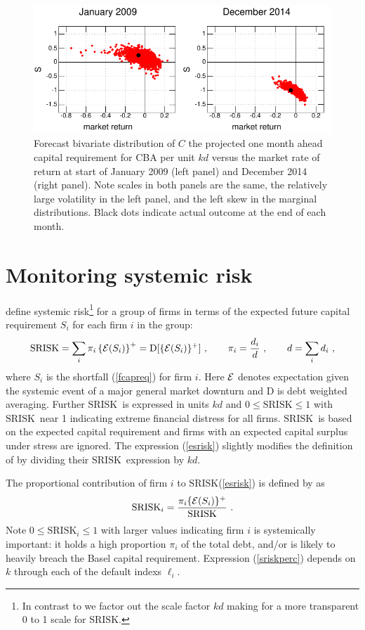 \documentclass[authoryear]{elsarticle}
\newcommand{\Ex}{{\cal E}}
\newcommand{\Es}{\Ex}
\newcommand{\SR}{\ensuremath{\mathrm{SRISK}}}
\newcommand{\eref}[1]{(\ref{#1})}
\newcommand{\cq}{\ , \qquad}
\newcommand{\be}[1]{\begin{equation}\label{#1}}
\newcommand{\ee}{\end{equation}}
\newcommand{\D}{\mathrm{D}}
\begin{document}
\begin{figure}[htbp]
\begin{center}
\includegraphics[width=12cm]{figures/figCBA.pdf}
\caption{Forecast bivariate distribution of $C$ the projected  one month ahead capital requirement for CBA per unit $kd$ versus the market rate of return at start of January 2009 (left panel)  and December 2014 (right panel). Note scales in both panels are the same, the relatively large volatility in the left panel, and the left skew in the  marginal distributions.  Black dots indicate actual  outcome at the end of each month.}\label{simulation}
\end{center}
\end{figure}

\section{Monitoring systemic risk}\label{srisk}

 \cite{brownlees2015} define  systemic risk\footnote{In contrast to \cite{brownlees2015} we factor out the scale factor $kd$ making for a more transparent 0 to 1 scale for \SR.} for a group of firms in terms of the expected future capital requirement $S_i$ for each firm $i$ in the group:
\be{esrisk}
\SR =  \sum_i \pi_i\left\{\Es(S_i)\right\}^+ = \D[\{\Ex(S_i)\}^+]\cq \pi_i = \frac{d_i}{d}\cq d=\sum_id_i \ ,
\ee
where $S_i$ is the shortfall \eref{fcapreq} for firm $i$.
Here $\Es$ denotes expectation given the systemic event of a major general market downturn and $\D$ is debt weighted averaging.    Further \SR\ is expressed in units $kd$ and $0\le\SR\le 1$ with \SR\ near 1 indicating extreme financial distress for all firms. \SR\ is based on the expected capital requirement and firms with an expected capital surplus under stress are ignored.   The expression \eref{esrisk} slightly modifies the definition  of \cite{brownlees2015} by dividing their \SR\ expression by $kd$. 

The proportional contribution of firm $i$ to \SR \eref{esrisk}  is defined by   \citep{brownlees2015} as
\be{sriskperc}
\SR_i=\frac{\pi_i\{\Ex(S_i)\}^+}{\SR} \ .
 \ee
 Note $0\le \SR_i\le 1$ with larger values indicating firm $i$ is systemically important: it holds a high proportion $\pi_i$ of the total debt, and/or is likely to heavily breach the Basel capital requirement.  Expression \eref{sriskperc} depends on $k$ through each of the default indexs $\ell_i$. 
\end{document}
